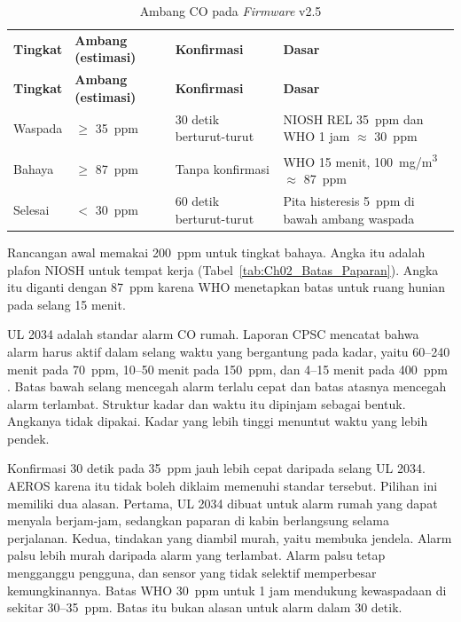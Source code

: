     \begin{longtable}{|L{2.0cm}|L{2.8cm}|L{3.4cm}|L{6.4cm}|}
        \caption{Ambang CO pada \textit{Firmware} v2.5}
        \label{tab:Ch03_Ambang_CO}
        \vspace{-0.75em}\\
        \hline
        \textbf{Tingkat} & \textbf{Ambang (estimasi)} & \textbf{Konfirmasi} & \textbf{Dasar} \\ \hline
        \endfirsthead
        \hline
        \textbf{Tingkat} & \textbf{Ambang (estimasi)} & \textbf{Konfirmasi} & \textbf{Dasar} \\ \hline
        \endhead
        Waspada & $\geq$ 35~ppm & 30 detik berturut-turut & NIOSH REL 35~ppm \cite{niosh_co} dan WHO 1 jam $\approx$ 30~ppm \cite{who_iaq} \\ \hline
        Bahaya & $\geq$ 87~ppm & Tanpa konfirmasi & WHO 15 menit, 100~mg/m\textsuperscript{3} $\approx$ 87~ppm \cite{who_iaq} \\ \hline
        Selesai & $<$ 30~ppm & 60 detik berturut-turut & Pita histeresis 5~ppm di bawah ambang waspada \\ \hline
    \end{longtable}

    Rancangan awal memakai 200~ppm untuk tingkat bahaya. Angka itu adalah plafon NIOSH untuk tempat kerja (Tabel~\ref{tab:Ch02_Batas_Paparan}). Angka itu diganti dengan 87~ppm karena WHO menetapkan batas untuk ruang hunian pada selang 15 menit.

    UL 2034 adalah standar alarm CO rumah. Laporan CPSC mencatat bahwa alarm harus aktif dalam selang waktu yang bergantung pada kadar, yaitu 60--240 menit pada 70~ppm, 10--50 menit pada 150~ppm, dan 4--15 menit pada 400~ppm \cite{cpsc_ul2034}. Batas bawah selang mencegah alarm terlalu cepat dan batas atasnya mencegah alarm terlambat. Struktur kadar dan waktu itu dipinjam sebagai bentuk. Angkanya tidak dipakai. Kadar yang lebih tinggi menuntut waktu yang lebih pendek.

    Konfirmasi 30 detik pada 35~ppm jauh lebih cepat daripada selang UL 2034. AEROS karena itu tidak boleh diklaim memenuhi standar tersebut. Pilihan ini memiliki dua alasan. Pertama, UL 2034 dibuat untuk alarm rumah yang dapat menyala berjam-jam, sedangkan paparan di kabin berlangsung selama perjalanan. Kedua, tindakan yang diambil murah, yaitu membuka jendela. Alarm palsu lebih murah daripada alarm yang terlambat. Alarm palsu tetap mengganggu pengguna, dan sensor yang tidak selektif memperbesar kemungkinannya. Batas WHO 30~ppm untuk 1 jam mendukung kewaspadaan di sekitar 30--35~ppm. Batas itu bukan alasan untuk alarm dalam 30 detik.

